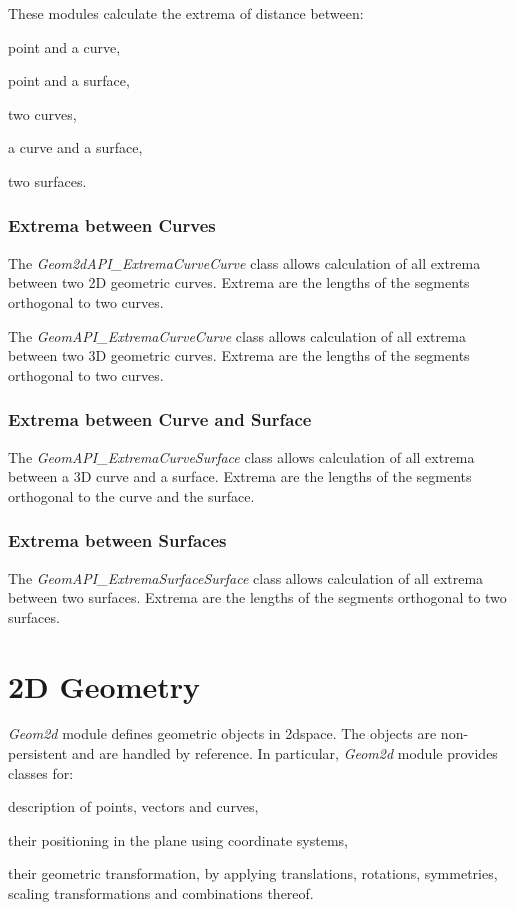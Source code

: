These modules calculate the extrema of distance between\+:
\begin{DoxyItemize}
\item point and a curve,
\item point and a surface,
\item two curves,
\item a curve and a surface,
\item two surfaces.
\end{DoxyItemize}

\subsubsection*{Extrema between Curves}

The {\itshape Geom2d\+A\+P\+I\+\_\+\+Extrema\+Curve\+Curve} class allows calculation of all extrema between two 2D geometric curves. Extrema are the lengths of the segments orthogonal to two curves.

The {\itshape Geom\+A\+P\+I\+\_\+\+Extrema\+Curve\+Curve} class allows calculation of all extrema between two 3D geometric curves. Extrema are the lengths of the segments orthogonal to two curves.

\subsubsection*{Extrema between Curve and Surface}

The {\itshape Geom\+A\+P\+I\+\_\+\+Extrema\+Curve\+Surface} class allows calculation of all extrema between a 3D curve and a surface. Extrema are the lengths of the segments orthogonal to the curve and the surface.

\subsubsection*{Extrema between Surfaces}

The {\itshape Geom\+A\+P\+I\+\_\+\+Extrema\+Surface\+Surface} class allows calculation of all extrema between two surfaces. Extrema are the lengths of the segments orthogonal to two surfaces.\hypertarget{occt_user_guides__modeling_data_occt_modat_2}{}\section{2\+D Geometry}\label{occt_user_guides__modeling_data_occt_modat_2}
{\itshape Geom2d} module defines geometric objects in 2dspace. The objects are non-\/persistent and are handled by reference. In particular, {\itshape Geom2d} module provides classes for\+:
\begin{DoxyItemize}
\item description of points, vectors and curves,
\item their positioning in the plane using coordinate systems,
\item their geometric transformation, by applying translations, rotations, symmetries, scaling transformations and combinations thereof.
\end{DoxyItemize}

